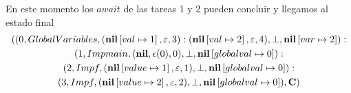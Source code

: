 En este momento los $await$ de las tareas 1 y 2 pueden concluir y llegamos al estado final
\begin{multline*}
  ((0, GlobalVariables, (\textbf{nil}\left[ val\mapsto1 \right], \varepsilon, 3):(\textbf{nil}\left[ val\mapsto2 \right], \varepsilon, 4), \perp, \textbf{nil}\left[ var\mapsto2 \right]):\\
  (1, Impmain, (\textbf{nil}, \epsilon(0), 0), \perp, \textbf{nil}\left[ globalval\mapsto0 \right]):\\
  (2, Impf, (\textbf{nil}\left[ value\mapsto1 \right], \varepsilon, 1), \perp, \textbf{nil}\left[ globalval\mapsto0 \right]):\\
  (3, Impf ,(\textbf{nil}\left[ value\mapsto2 \right], \varepsilon, 2), \perp, \textbf{nil}\left[ globalval\mapsto0 \right]), \mathbf{C})
\end{multline*}
